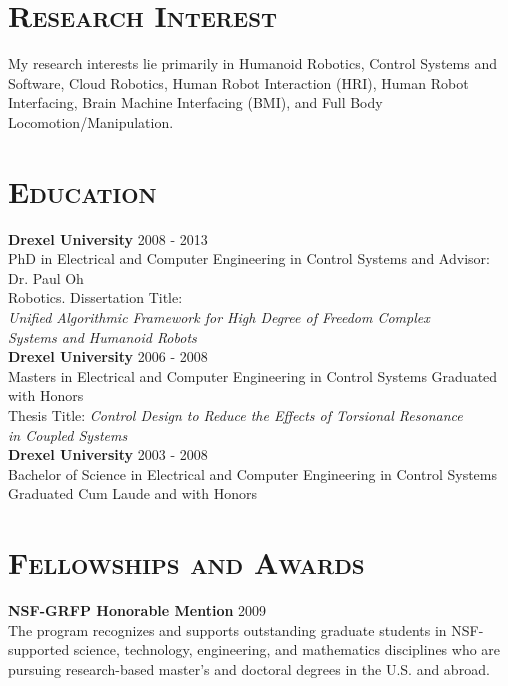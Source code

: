 \begin{resume}




\section{\textsc{Research Interest}}
My research interests lie primarily in Humanoid Robotics, Control Systems and Software, Cloud Robotics, Human Robot Interaction (HRI), Human Robot Interfacing, Brain Machine Interfacing (BMI), and Full Body Locomotion/Manipulation.



\section{\textsc{Education}}

\textbf{Drexel University} \hfill 2008 - 2013 \\
PhD in Electrical and Computer Engineering in Control Systems and \hfill Advisor: Dr. Paul Oh \\
Robotics. Dissertation Title: \\
\textit{Uniﬁed Algorithmic Framework for High Degree of Freedom Complex\\
Systems and Humanoid Robots}\\
\newline
\textbf{Drexel University} \hfill 2006 - 2008 \\ 
Masters in Electrical and Computer Engineering in Control Systems \hfill Graduated with Honors\\
Thesis Title: \textit{Control Design to Reduce the Effects of Torsional Resonance\\
in Coupled Systems}\\
\newline
\textbf{Drexel University} \hfill 2003 - 2008 \\ 
Bachelor of Science in Electrical and Computer Engineering in Control Systems \hfill Graduated Cum Laude and with Honors



\section{\textsc{Fellowships and Awards}}



\textbf{NSF-GRFP Honorable Mention} \hfill 2009 \\ 
The program recognizes and supports outstanding graduate students in NSF-supported science, technology, engineering, and mathematics disciplines who are pursuing research-based master's and doctoral degrees in the U.S. and abroad. 
\newline



\end{resume}
